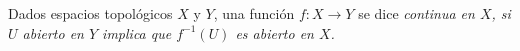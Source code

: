 
\begin{definition}
Dados espacios topológicos $X$ y $Y$, una función $f : X \longrightarrow Y$ se dice \itshape{continua} en $X$, si $U$ abierto en $Y$ implica que $f^{-1}(U)$ es abierto en $X$.
\end{definition}
